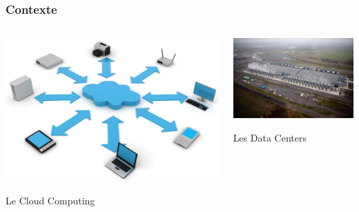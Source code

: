 \documentclass[xcolor=dvipsnames]{beamer}
\begin{document}
\begin{frame}
\frametitle{Contexte}
\begin{columns}
\begin{column}{0.45\textwidth}

\includegraphics[scale=0.2]{cloud-computing.jpg}
\begin{block}{}
\begin{minipage}{\textwidth}
\begin{center}
Le Cloud Computing 
\end{center}

\end{minipage}
\end{block}

\end{column}
\begin{column}{0.5\textwidth}
\includegraphics[scale=0.38]{dt.jpg}
\begin{block}{}
\begin{minipage}{\textwidth}
\begin{center}
Les Data Centers
\end{center}

\end{minipage}
\end{block}
\end{column}

\end{columns}


\end{frame}
\end{document}
